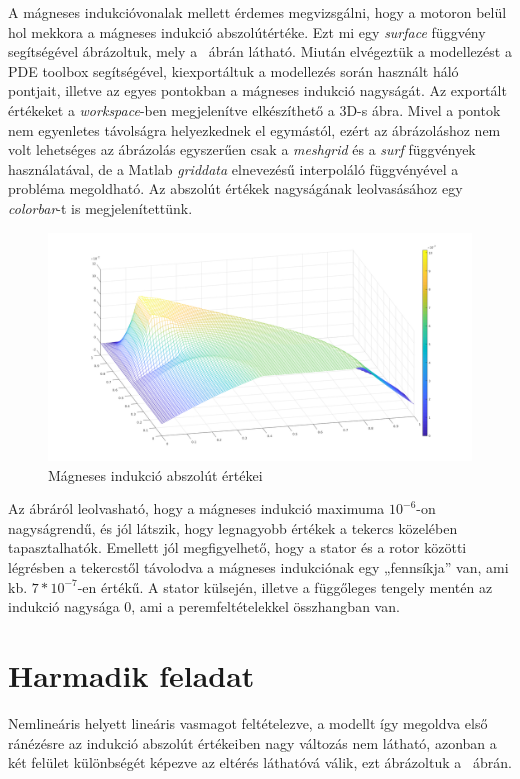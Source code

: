 A mágneses indukcióvonalak mellett érdemes megvizsgálni, hogy a motoron belül hol mekkora a mágneses indukció abszolútértéke. Ezt mi egy \textit{surface} függvény segítségével ábrázoltuk, mely a ~ábrán látható. Miután elvégeztük a modellezést a PDE toolbox segítségével, kiexportáltuk a modellezés során használt háló pontjait, illetve az egyes pontokban a mágneses indukció nagyságát. Az exportált értékeket a \textit{workspace}-ben megjelenítve elkészíthető a 3D-s ábra. Mivel a pontok nem egyenletes távolságra helyezkednek el egymástól, ezért az ábrázoláshoz nem volt lehetséges az ábrázolás egyszerűen csak a \textit{meshgrid} és a \textit{surf} függvények használatával, de a Matlab \textit{griddata} elnevezésű interpoláló függvényével a probléma megoldható. Az abszolút értékek nagyságának leolvasásához egy \textit{colorbar}-t is megjelenítettünk.

\begin{figure}[!ht]
	\centering
	\includegraphics[width=150mm, keepaspectratio]{figures/terek/normal_eloszlas}
	\caption{Mágneses indukció abszolút értékei}
	\label{fig:normaleloszlas}
\end{figure}


Az ábráról leolvasható, hogy a mágneses indukció maximuma  $ 10^{-6} $-on nagyságrendű, és jól látszik, hogy legnagyobb értékek a tekercs közelében tapasztalhatók. Emellett jól megfigyelhető, hogy a stator és a rotor közötti légrésben a tekercstől távolodva a mágneses indukciónak egy „fennsíkja” van, ami kb.  $ 7*10^{-7} $-en értékű. A stator külsején, illetve a függőleges tengely mentén az indukció nagysága 0, ami a peremfeltételekkel összhangban van.

\section{Harmadik feladat}
Nemlineáris helyett lineáris vasmagot feltételezve, a modellt így megoldva első ránézésre az indukció abszolút értékeiben nagy változás nem látható, azonban a két felület különbségét képezve az eltérés láthatóvá válik, ezt ábrázoltuk a ~ábrán.

